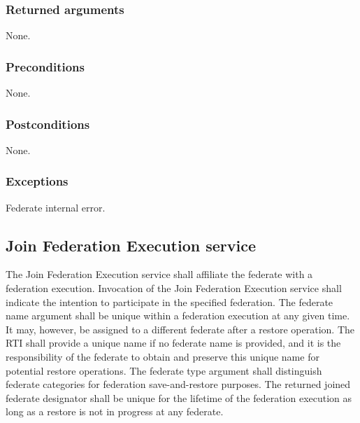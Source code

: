 \begin{compactstdpage}
    \subsubsection{Returned arguments}

    \begin{stdalphalist}
        \item None.
    \end{stdalphalist}

    \subsubsection{Preconditions}

    \begin{stdalphalist}
        \item None.
    \end{stdalphalist}

\end{compactstdpage}
\clearpage


\subsubsection{Postconditions}

\begin{stdalphalist}
    \item None.
\end{stdalphalist}

\subsubsection{Exceptions}

\begin{stdalphalist}
    \item Federate internal error.
\end{stdalphalist}

\subsection{Join Federation Execution service}

The Join Federation Execution service shall affiliate the federate with a federation execution. Invocation of the Join Federation Execution service shall indicate the intention to participate in the specified federation. The federate name argument shall be unique within a federation execution at any given time. It may, however, be assigned to a different federate after a restore operation. The RTI shall provide a unique name if no federate name is provided, and it is the responsibility of the federate to obtain and preserve this unique name for potential restore operations. The federate type argument shall distinguish federate categories for federation save-and-restore purposes. The returned joined federate designator shall be unique for the lifetime of the federation execution as long as a restore is not in progress at any federate.

